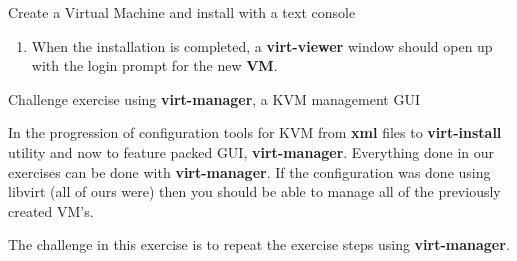 \begin{Lab}
\begin{exe}  {Create a Virtual Machine and install with a text console}
\begin{sol}
\begin{enumerate}
\begin{raw}
		\end{raw}
		\item When the installation is completed, a 
			\textbf{virt-viewer} window should open up 
			with the login prompt for the new \textbf{VM}.
			
	\end{enumerate}

	\end{sol}

\end{exe}

\begin{exe} {Challenge exercise using \textbf{virt-manager}, a KVM management GUI}

	In the progression of configuration tools for KVM from \textbf{xml} files
	to \textbf{virt-install} utility and now to feature packed GUI, 
	\textbf{virt-manager}. 
	Everything done in our exercises can be done with \textbf{virt-manager}. If 
	the configuration was done using libvirt (all of ours were) then
	you should be able to manage all of the previously created VM's. 

	The challenge in this exercise is to repeat the exercise steps 
	using \textbf{virt-manager}.

\end{exe}

\end{Lab}


